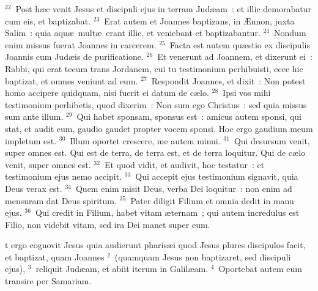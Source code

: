 ${}^{22}$~Post h\ae c venit Jesus et discipuli ejus in terram Jud\ae am~: et illic demorabatur cum eis, et baptizabat.
${}^{23}$~Erat autem et Joannes baptizans, in \AE nnon, juxta Salim~: quia aqu\ae\ mult\ae\ erant illic, et veniebant et baptizabantur.
${}^{24}$~Nondum enim missus fuerat Joannes in carcerem.
${}^{25}$~Facta est autem qu\ae stio ex discipulis Joannis cum Jud\ae is de purificatione.
${}^{26}$~Et venerunt ad Joannem, et dixerunt ei~: Rabbi, qui erat tecum trans Jordanem, cui tu testimonium perhibuisti, ecce hic baptizat, et omnes veniunt ad eum.
${}^{27}$~Respondit Joannes, et dixit~: Non potest homo accipere quidquam, nisi fuerit ei datum de c\ae lo.
${}^{28}$~Ipsi vos mihi testimonium perhibetis, quod dixerim~: Non sum ego Christus~: sed quia missus sum ante illum.
${}^{29}$~Qui habet sponsam, sponsus est~: amicus autem sponsi, qui stat, et audit eum, gaudio gaudet propter vocem sponsi. Hoc ergo gaudium meum impletum est.
${}^{30}$~Illum oportet crescere, me autem minui.
${}^{31}$~Qui desursum venit, super omnes est. Qui est de terra, de terra est, et de terra loquitur. Qui de c\ae lo venit, super omnes est.
${}^{32}$~Et quod vidit, et audivit, hoc testatur~: et testimonium ejus nemo accipit.
${}^{33}$~Qui accepit ejus testimonium signavit, quia Deus verax est.
${}^{34}$~Quem enim misit Deus, verba Dei loquitur~: non enim ad mensuram dat Deus spiritum.
${}^{35}$~Pater diligit Filium et omnia dedit in manu ejus.
${}^{36}$~Qui credit in Filium, habet vitam \ae ternam~; qui autem incredulus est Filio, non videbit vitam, sed ira Dei manet super eum.

\bchapter
{}t ergo cognovit Jesus quia audierunt pharis\ae i quod Jesus plures discipulos facit, et baptizat, quam Joannes
${}^{2}$~(quamquam Jesus non baptizaret, sed discipuli ejus),
${}^{3}$~reliquit Jud\ae am, et abiit iterum in Galil\ae am.
${}^{4}$~Oportebat autem eum transire per Samariam.



